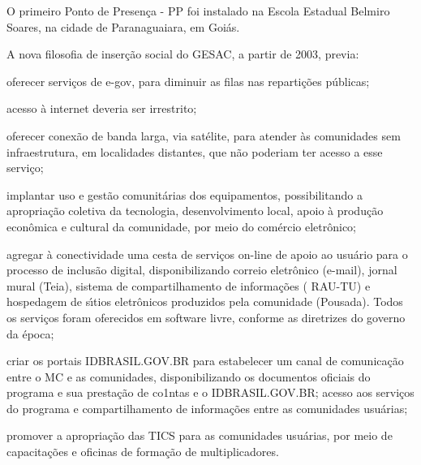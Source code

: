 \documentclass[
12pt,		%
openright,	%
twoside,  %
a4paper,			%
chapter=TITLE,		%
english,			%
french,				%
spanish,			%
brazil				%
]{USPSC-classe/USPSC}
\begin{document}
O primeiro Ponto de Presen\c{c}a - PP foi  instalado na  Escola Estadual Belmiro Soares, na cidade de Paranaguaiara, em  Goi\'as.














A nova filosofia  de inser\c{c}\~ao social do GESAC, a partir de 2003, previa:















\begin{alineas}
\item oferecer servi\c{c}os de e-gov, para diminuir as filas nas reparti\c{c}\~oes p\'ublicas;
\item acesso \`a internet deveria ser irrestrito;
\item oferecer conex\~ao de banda larga, via sat\'elite, para atender \`as comunidades sem infraestrutura,  em localidades distantes, que n\~ao poderiam ter acesso a esse servi\c{c}o;
\item implantar uso e gest\~ao comunit\'arias dos equipamentos, possibilitando a apropria\c{c}\~ao coletiva  da tecnologia,  desenvolvimento local, apoio \`a produ\c{c}\~ao econ\^omica e cultural da comunidade, por meio do com\'ercio eletr\^onico;
\item agregar \`a conectividade uma cesta de servi\c{c}os on-line de apoio ao usu\'ario para o processo de inclus\~ao digital, disponibilizando correio eletr\^onico (e-mail),  jornal mural (Teia), sistema de compartilhamento de informa\c{c}\~oes ( RAU-TU) e hospedagem de s\'{\i}tios eletr\^onicos produzidos pela comunidade (Pousada). Todos os servi\c{c}os  foram oferecidos em software livre, conforme as diretrizes do governo da \'epoca;
\item criar  os portais IDBRASIL.GOV.BR para estabelecer um canal de comunica\c{c}\~ao entre o MC e as comunidades, disponibilizando os documentos oficiais do programa e sua presta\c{c}\~ao de co1ntas e o IDBRASIL.GOV.BR; acesso aos servi\c{c}os do programa e compartilhamento  de informa\c{c}\~oes  entre as comunidades usu\'arias;
\item promover a apropria\c{c}\~ao das TICS  para as comunidades usu\'arias, por meio de  capacita\c{c}\~oes e oficinas de forma\c{c}\~ao de multiplicadores.
\end{alineas}
\end{document}
